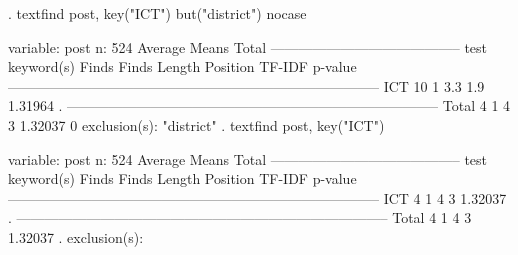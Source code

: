 {\smallskip}
. textfind post, key("ICT") but("district") nocase

{\smallskip}
                               {}
variable:   post
n: 524                                       Average                       Means
                    Total   -----------------------------------------       test
keyword(s)          Finds      Finds     Length   Position     TF-IDF    p-value
--------------------------------------------------------------------------------
ICT                    10          1        3.3        1.9    1.31964          .
--------------------------------------------------------------------------------
Total                   4          1          4          3    1.32037          0
exclusion(s):
"district"
{\smallskip}
. textfind post, key("ICT")

{\smallskip}
                               {}
variable:   post
n: 524                                       Average                       Means
                    Total   -----------------------------------------       test
keyword(s)          Finds      Finds     Length   Position     TF-IDF    p-value
--------------------------------------------------------------------------------
ICT                     4          1          4          3    1.32037          .
--------------------------------------------------------------------------------
Total                   4          1          4          3    1.32037          .
exclusion(s):
{\smallskip}
